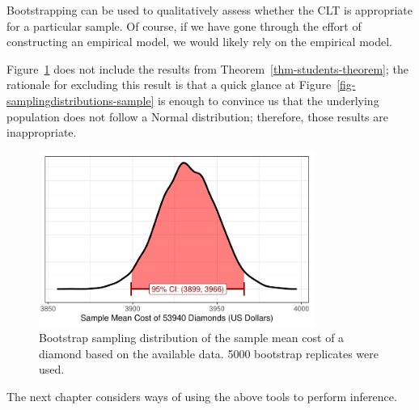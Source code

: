 \documentclass[
  letterpaper,
  DIV=11,
  numbers=noendperiod]{scrreprt}
\theoremstyle{plain}
\theoremstyle{definition}
\theoremstyle{definition}
\theoremstyle{remark}
\begin{document}
\begin{tcolorbox}[enhanced jigsaw, toprule=.15mm, left=2mm, title=\textcolor{quarto-callout-note-color}{\faInfo}\hspace{0.5em}{Note}, opacityback=0, toptitle=1mm, leftrule=.75mm, colbacktitle=quarto-callout-note-color!10!white, opacitybacktitle=0.6, titlerule=0mm, breakable, colframe=quarto-callout-note-color-frame, arc=.35mm, coltitle=black, bottomtitle=1mm, rightrule=.15mm, colback=white, bottomrule=.15mm]

Bootstrapping can be used to qualitatively assess whether the CLT is
appropriate for a particular sample. Of course, if we have gone through
the effort of constructing an empirical model, we would likely rely on
the empirical model.

\end{tcolorbox}

Figure~\ref{fig-samplingdistributions-bootstrap} does not include the
results from Theorem~\ref{thm-students-theorem}; the rationale for
excluding this result is that a quick glance at
Figure~\ref{fig-samplingdistributions-sample} is enough to convince us
that the underlying population does not follow a Normal distribution;
therefore, those results are inappropriate.

\begin{figure}

{\centering \includegraphics[width=0.8\textwidth,height=\textheight]{./images/fig-samplingdistributions-bootstrap-1.pdf}

}

\caption{\label{fig-samplingdistributions-bootstrap}Bootstrap sampling
distribution of the sample mean cost of a diamond based on the available
data. 5000 bootstrap replicates were used.}

\end{figure}

The next chapter considers ways of using the above tools to perform
inference.
\end{document}
